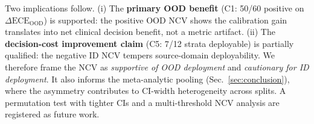\documentclass[review,12pt,nonatbib]{elsarticle}
\begin{document}
Two implications follow. (i) The \textbf{primary OOD benefit}
(C1: 50/60 positive on $\Delta\text{ECE}_{\text{OOD}}$) is supported: the positive OOD NCV shows the
calibration gain translates into net clinical decision benefit, not a
metric artifact. (ii) The \textbf{decision-cost
improvement claim} (C5: 7/12 strata deployable) is partially qualified:
the negative ID NCV tempers source-domain deployability. We therefore
frame the NCV as \emph{supportive of OOD deployment} and \emph{cautionary
for ID deployment}. It also informs the meta-analytic pooling
(Sec.~\ref{sec:conclusion}), where the asymmetry contributes to CI-width
heterogeneity across splits. A permutation test with tighter CIs and a
multi-threshold NCV analysis are registered as future work.

\end{document}

